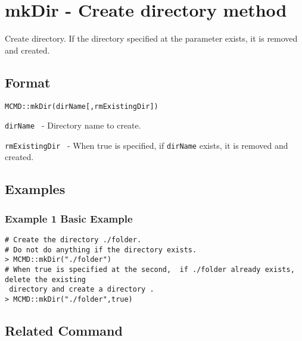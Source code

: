 
%

\section{mkDir - Create directory method \label{sect:mkDir}}

Create directory. If the directory specified at the parameter exists, it is removed and created. 

\subsection{Format}

{\large
\begin{verbatim}
MCMD::mkDir(dirName[,rmExistingDir])
\end{verbatim}
}  

\begin{description}
	\setlength{\itemindent}{-5mm}
	\item {\large \verb/dirName /} - Directory name to create.
	\item {\large \verb/rmExistingDir /} - When true is specified, if \verb/dirName/ exists, it is removed and created. 
\end{description}

\subsection{Examples }
\subsubsection*{Example 1 Basic Example}

\begin{Verbatim}[baselinestretch=0.7,frame=single]
# Create the directory ./folder. 
# Do not do anything if the directory exists. 
> MCMD::mkDir("./folder")
# When true is specified at the second,  if ./folder already exists, delete the existing
 directory and create a directory . 
> MCMD::mkDir("./folder",true)
\end{Verbatim}

\subsection{Related Command}

%

